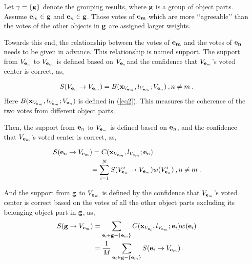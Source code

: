 Let $\gamma=\{\bf{g}\}$ denote the grouping results, where $\bf{g}$ is a group of object parts.  Assume ${{\bf{e}}_m}\in \bf{g}$ and ${{\bf{e}}_n}\in \bf{g}$. Those votes of ${\bf{e}_m}$ which are more {\lq\lq}agreeable{\rq\rq} than the votes of the other objects in $\bf{g}$ are assigned larger weights.

Towards this end, the relationship between the votes of $\bf{e}_m$ and the votes of $\bf{e}_n$ needs to be given in advance. This relationship is named support. The support from ${V_{{{\bf{e}}_n}}}$ to ${V_{{{\bf{e}}_m}}}$ is defined based on ${V_{{{\bf{e}}_n}}}$and the confidence that ${V_{{{\bf{e}}_m}}}$'s voted center is correct, as,


\[
S({V_{{{\bf{e}}_n}}} \to {V_{{{\bf{e}}_m}}})  =  B({\bf{x}}_{V_{{{\bf{e}}_m}}},l_{V_{{{\bf{e}}_m}}};{V_{{{\bf{e}}_n}}})\:,n \ne m\:.
\]
Here $B({\bf{x}}_{V_{{{\bf{e}}_m}}},l_{V_{{{\bf{e}}_m}}};{V_{{{\bf{e}}_n}}})$ is defined in (\ref{eq2}). This measures the coherence of the two votes from different object parts.

Then, the support from ${{\bf{e}}_n}$ to ${V_{{{\bf{e}}_m}}}$ is defined  based on ${{\bf{e}}_n}$, and the confidence that $V_{{{\bf{e}}_m}}$'s voted center is correct, as,

\[
\begin{aligned}
S({{{\bf{e}}_n} \to {V_{{{\bf{e}}_m}}}}) &= C({\bf{x}}_{V_{{{\bf{e}}_m}}},l_{V_{{{\bf{e}}_m}}};{{{\bf{e}}_n}})\\
& {
=\sum\limits^N_{i=1} {S({{V^i_{{{\bf{e}}_n}}} \to {V_{{{\bf{e}}_m}}}})w(V^i_{{\bf{e}}_n})}\:,n \ne m\:.
}
\end{aligned}
\]

And the support from ${\bf{g}}$ to $V_{{\bf{e}}_m}$ is defined by the confidence that $V_{{\bf{e}}_m}$'s voted center is correct based on the votes of all the other object parts excluding its belonging object part in $\bf{g}$, as,
\[
\begin{aligned}
S({\bf{g}} \to V_{{\bf{e}}_m})
&= \sum\limits_{{{\bf{e}}_i} \in {\bf{g}}- \{ {{\bf{e}}_m} \} }{C({\bf{x}}_{V_{{{\bf{e}}_i}}},l_{V_{{{\bf{e}}_m}}};{{{\bf{e}}_i}})w({{\bf{e}}_i})}\\
& =\frac 1 M  \sum\limits_{{{\bf{e}}_i} \in {\bf{g}}- \{ {{\bf{e}}_m} \}} {S({{{\bf{e}}_i} \to {V_{{{\bf{e}}_m}}}})} \:.
\end{aligned}
\]


